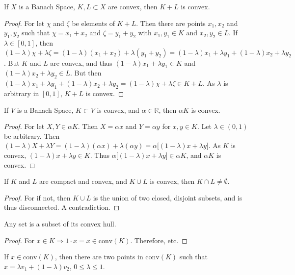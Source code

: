         \begin{theorem}
        If $X$ is a Banach Space, $K,L\subset X$ are convex, then $K+L$ is convex.
        \end{theorem}
        \begin{proof}
        For let $\chi$ and $\zeta$ be elements of $K+L$. Then there are points $x_1,x_2$ and $y_1,y_2$ such that $\chi=x_1+x_2$ and $\zeta = y_1+y_2$ with $x_1,y_1\in K$ and $x_2,y_2\in L$. If $\lambda \in [0,1]$, then $(1-\lambda)\chi + \lambda \zeta = (1-\lambda)(x_1+x_2)+\lambda(y_1+y_2) = (1-\lambda)x_1 + \lambda y_1 + (1-\lambda)x_2 + \lambda y_2$. But $K$ and $L$ are convex, and thus $(1-\lambda)x_1 + \lambda y_1 \in K$ and $(1-\lambda)x_2 + \lambda y_2 \in L$. But then $(1-\lambda)x_1 + \lambda y_1 + (1-\lambda)x_2 + \lambda y_2=(1-\lambda)\chi + \lambda \zeta\in K+L$. As $\lambda$ is arbitrary in $[0,1]$, $K+L$ is convex.
        \end{proof}
        \begin{theorem}
        If $V$ is a Banach Space, $K\subset V$ is convex, and $\alpha \in \mathbb{R}$, then $\alpha K$ is convex.
        \end{theorem}
        \begin{proof}
        For let $X,Y\in \alpha K$. Then $X = \alpha x$ and $Y = \alpha y$ for $x,y\in K$. Let $\lambda \in (0,1)$ be arbitrary. Then $(1-\lambda)X+\lambda Y =(1-\lambda)(\alpha x)+\lambda (\alpha y) = \alpha\big[(1-\lambda)x+\lambda y\big]$. As $K$ is convex, $(1-\lambda)x+\lambda y \in K$. Thus $\alpha\big[(1-\lambda)x+\lambda y\big] \in \alpha K$, and $\alpha K$ is convex.
        \end{proof}
        \begin{theorem}
        If $K$ and $L$ are compact and convex, and $K\cup L$ is convex, then $K\cap L \ne \emptyset$.
        \end{theorem}
        \begin{proof}
        For if not, then $K\cup L$ is the union of two closed, disjoint subsets, and is thus disconnected. A contradiction. 
        \end{proof}
        \begin{theorem}
        Any set is a subset of its convex hull.
        \end{theorem}
        \begin{proof}
        For $x\in K \Rightarrow 1\cdot x=x \in \textrm{conv}(K)$. Therefore, etc.
        \end{proof}
        \begin{theorem}
        If $x\in \textrm{conv}(K)$, then there are two points in $\textrm{conv}(K)$ such that $x = \lambda v_1 +(1- \lambda) v_2$, $0 \leq \lambda \leq 1$.
        \end{theorem}
